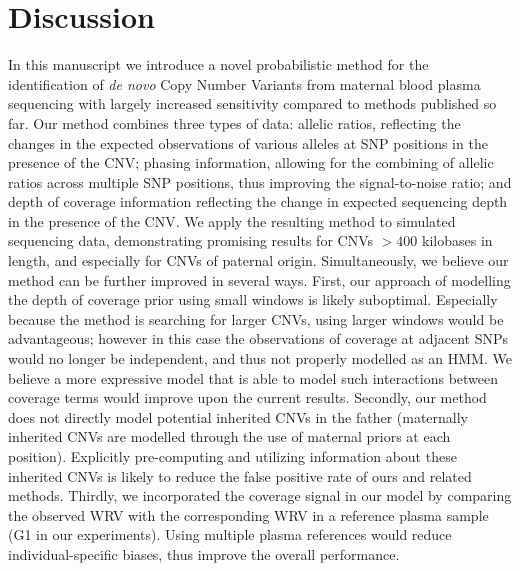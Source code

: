 \section{Discussion}

In this manuscript we introduce a novel probabilistic method for the identification of \textit{de novo} Copy Number Variants from maternal blood plasma sequencing with largely increased sensitivity compared to methods published so far. Our method combines three types of data: allelic ratios, reflecting the changes in the expected observations of various alleles at SNP positions in the presence of the CNV; phasing information, allowing for the combining of allelic ratios across multiple SNP positions, thus improving the signal-to-noise ratio; and depth of coverage information reflecting the change in expected sequencing depth in the presence of the CNV. We apply the resulting method to simulated sequencing data, demonstrating promising results for CNVs ${>400}$ kilobases in length, and especially for CNVs of paternal origin. 
Simultaneously, we believe our method can be further improved in several ways. First, our approach of modelling the depth of coverage prior using small windows is likely suboptimal. Especially because the method is searching for larger CNVs, using larger windows	 would be advantageous; however in this case the observations of coverage at adjacent SNPs would no longer be independent,  and thus not properly modelled as an HMM. We believe a more expressive model that is able to model such interactions between coverage terms would improve upon the current results. Secondly, our method does not directly model potential inherited CNVs in the father (maternally inherited CNVs are modelled through the use of maternal priors at each position). Explicitly pre-computing and utilizing information about these inherited CNVs is likely to reduce the false positive rate of ours and related methods.
Thirdly, we incorporated the coverage signal in our model by comparing the observed WRV with the corresponding WRV in a reference plasma sample (G1 in our experiments). Using multiple plasma references would reduce individual-specific biases, thus improve the overall performance.
